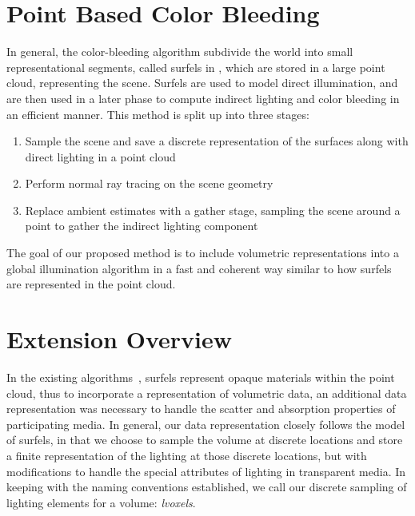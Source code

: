 \documentclass[12pt]{ucthesis}
\begin{document}
\section{Point Based Color Bleeding}

In general, the color-bleeding algorithm subdivide the world into small representational segments, called surfels in \cite{christensen:2008}, which are stored in a large point cloud, representing the scene.  Surfels are used to model direct illumination, and are then used in a later phase to compute indirect lighting and color bleeding in an efficient manner.  This method is split up into three stages:

\begin{enumerate}
\item Sample the scene and save a discrete representation of the surfaces along with direct lighting in a point cloud
\item Perform normal ray tracing on the scene geometry
\item Replace ambient estimates with a gather stage, sampling the scene around a point to gather the indirect lighting component
\end{enumerate}

The goal of our proposed method is to include volumetric representations into a global illumination algorithm in a fast and coherent way similar to how surfels are represented in the point cloud.

\section{Extension Overview}

In the existing algorithms~\cite{christensen:2008}, surfels represent opaque materials within the point cloud, thus to incorporate a representation of volumetric data, an additional data representation was necessary to handle the scatter and absorption properties of participating media.  In general, our data representation closely follows the model of surfels, in that we choose to sample the volume at discrete locations and store a finite representation of the lighting at those discrete locations, but with modifications to handle the special attributes of lighting in transparent media.  In keeping with the naming conventions established, we call our discrete sampling of lighting elements for a volume: \emph{lvoxels}.  
\end{document}
